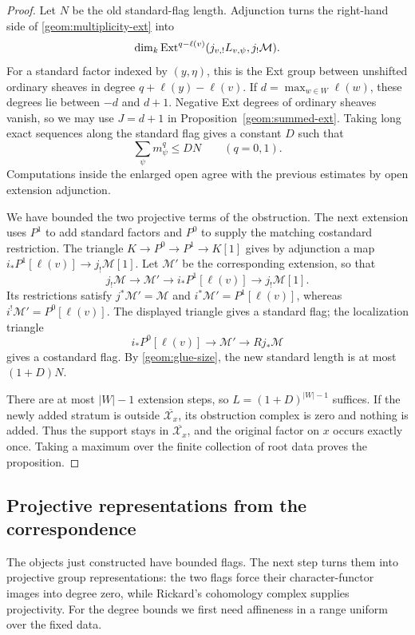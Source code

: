 \begin{proof}
Let \(N\) be the old standard-flag length. Adjunction turns the
right-hand side of \eqref{geom:multiplicity-ext} into
\[
 \dim_k\operatorname{Ext}^{q-\ell(v)}
       (j_{v,!}L_{v,\psi},j_!\mathcal M).
\]
For a standard factor indexed by \((y,\eta)\), this is the Ext group
between unshifted ordinary sheaves in degree
\(q+\ell(y)-\ell(v)\).  If
\(d=\max_{w\in W}\ell(w)\), these degrees lie between \(-d\)
and \(d+1\).  Negative Ext degrees of ordinary sheaves vanish,
so we may use \(J=d+1\) in Proposition~\ref{geom:summed-ext}.
Taking long exact sequences along the standard flag gives a
constant \(D\) such that
\begin{equation}\label{geom:glue-size}
 \sum_\psi m^q_\psi\le DN\qquad(q=0,1).
\end{equation}
Computations inside the enlarged open agree with the previous
estimates by open extension adjunction.

We have bounded the two projective terms of the obstruction.
The next extension uses \(P^1\) to add standard factors and
\(P^0\) to supply the matching costandard restriction.
The triangle
\(K\to P^0\to P^1\to K[1]\) gives by adjunction a map
\(i_*P^1[\ell(v)]\to j_!\mathcal M[1]\). Let \(\mathcal M'\) be the
corresponding extension, so that
\[
 j_!\mathcal M\longrightarrow\mathcal M'
 \longrightarrow i_*P^1[\ell(v)]
 \longrightarrow j_!\mathcal M[1].
\]
Its restrictions satisfy
\(j^*\mathcal M'=\mathcal M\) and
\(i^*\mathcal M'=P^1[\ell(v)]\), whereas
\(i^!\mathcal M'=P^0[\ell(v)]\). The displayed triangle gives a
standard flag; the localization triangle
\[
 i_*P^0[\ell(v)]\longrightarrow\mathcal M'
 \longrightarrow Rj_*\mathcal M
\]
gives a costandard flag. By \eqref{geom:glue-size}, the new standard
length is at most \((1+D)N\).

There are at most \(|W|-1\) extension steps, so
\(L=(1+D)^{|W|-1}\) suffices. If the newly added stratum is outside
\(\overline{\mathcal X_x}\), its obstruction complex is zero and
nothing is added. Thus the support stays in
\(\overline{\mathcal X_x}\), and the original
factor on \(x\) occurs exactly once. Taking a maximum over the finite
collection of root data proves the proposition.
\end{proof}

\subsection{Projective representations from the correspondence}

The objects just constructed have bounded flags.  The next step
turns them into projective group representations: the two flags
force their character-functor images into degree zero, while
Rickard's cohomology complex supplies projectivity.  For the
degree bounds we first need affineness in a range uniform over
the fixed data.

